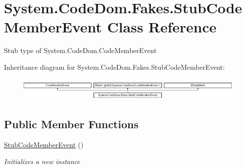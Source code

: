 \hypertarget{class_system_1_1_code_dom_1_1_fakes_1_1_stub_code_member_event}{\section{System.\-Code\-Dom.\-Fakes.\-Stub\-Code\-Member\-Event Class Reference}
\label{class_system_1_1_code_dom_1_1_fakes_1_1_stub_code_member_event}
}


Stub type of System.\-Code\-Dom.\-Code\-Member\-Event 


Inheritance diagram for System.\-Code\-Dom.\-Fakes.\-Stub\-Code\-Member\-Event\-:\begin{figure}[H]
\begin{center}
\leavevmode
\includegraphics[height=1.163032cm]{class_system_1_1_code_dom_1_1_fakes_1_1_stub_code_member_event}
\end{center}
\end{figure}
\subsection*{Public Member Functions}
\begin{DoxyCompactItemize}
\item 
\hyperlink{class_system_1_1_code_dom_1_1_fakes_1_1_stub_code_member_event_a086969d3e3211173edd6b61206dc5f9a}{Stub\-Code\-Member\-Event} ()
\begin{DoxyCompactList}\small\item\em Initializes a new instance\end{DoxyCompactList}\end{DoxyCompactItemize}
